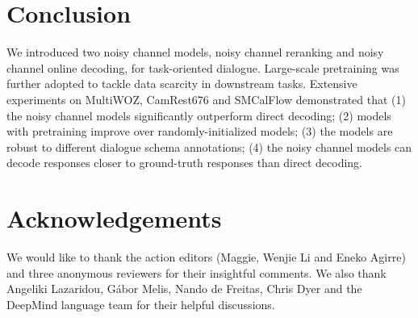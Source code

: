 \documentclass[11pt,a4paper]{article}
\begin{document}
\section*{Conclusion}
We introduced two noisy channel models, noisy channel reranking and noisy channel online decoding, for task-oriented dialogue. Large-scale pretraining was further adopted to tackle data scarcity in downstream tasks. Extensive experiments on MultiWOZ, CamRest676 and SMCalFlow demonstrated that (1) the noisy channel models significantly outperform direct decoding; (2) models with pretraining improve over randomly-initialized models; (3) the models are robust to different dialogue schema annotations; (4) the noisy channel models can decode responses closer to ground-truth responses than direct decoding.

\section*{Acknowledgements}
We would like to thank the action editors (Maggie, Wenjie Li and Eneko Agirre) and three anonymous reviewers for their insightful comments. We also thank Angeliki Lazaridou, Gábor Melis, Nando de Freitas, Chris Dyer and the DeepMind language team for their helpful discussions.



\end{document}
